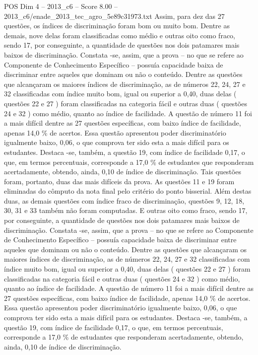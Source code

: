 \begin{textsample}{POS Dim 4 – 2013\_c6 – Score 8.00 – 2013\_c6/enade\_2013\_tec\_agro\_5e89c31973.txt}
Assim, para dez das 27 questões, os índices de discriminação foram bom ou muito bom.
Dentre as demais, nove delas foram classificadas como médio e outras oito como fraco, sendo 17, por conseguinte, a quantidade de questões nos dois patamares mais baixos de discriminação.
Constata -se, assim, que a prova – no que se refere ao Componente de Conhecimento Específico – possuía capacidade baixa de discriminar entre aqueles que dominam ou não o conteúdo.
Dentre as questões que alcançaram os maiores índices de discriminação, as de números 22, 24, 27 e 32 classificadas com índice muito bom, igual ou superior a 0,40, duas delas ( questões 22 e 27 ) foram classificadas na categoria fácil e outras duas ( questões 24 e 32 ) como médio, quanto ao índice de facilidade.
A questão de número 11 foi a mais difícil dentre as 27 questões específicas, com baixo índice de facilidade, apenas 14,0 \% de acertos.
Essa questão apresentou poder discriminatório igualmente baixo, 0,06, o que comprova ter sido esta a mais difícil para os estudantes.
Destaca -se, também, a questão 19, com índice de facilidade 0,17, o que, em termos percentuais, corresponde a 17,0 \% de estudantes que responderam acertadamente, obtendo, ainda, 0,10 de índice de discriminação.
Tais questões foram, portanto, duas das mais difíceis da prova.
As questões 11 e 19 foram eliminadas do cômputo da nota final pelo critério do ponto bisserial.
Além destas duas, as demais questões com índice fraco de discriminação, questões 9, 12, 18, 30, 31 e 33 também não foram computadas.
E outras oito como fraco, sendo 17, por conseguinte, a quantidade de questões nos dois patamares mais baixos de discriminação.
Constata -se, assim, que a prova – no que se refere ao Componente de Conhecimento Específico – possuía capacidade baixa de discriminar entre aqueles que dominam ou não o conteúdo.
Dentre as questões que alcançaram os maiores índices de discriminação, as de números 22, 24, 27 e 32 classificadas com índice muito bom, igual ou superior a 0,40, duas delas ( questões 22 e 27 ) foram classificadas na categoria fácil e outras duas ( questões 24 e 32 ) como médio, quanto ao índice de facilidade.
A questão de número 11 foi a mais difícil dentre as 27 questões específicas, com baixo índice de facilidade, apenas 14,0 \% de acertos.
Essa questão apresentou poder discriminatório igualmente baixo, 0,06, o que comprova ter sido esta a mais difícil para os estudantes.
Destaca -se, também, a questão 19, com índice de facilidade 0,17, o que, em termos percentuais, corresponde a 17,0 \% de estudantes que responderam acertadamente, obtendo, ainda, 0,10 de índice de discriminação.

\end{textsample}
